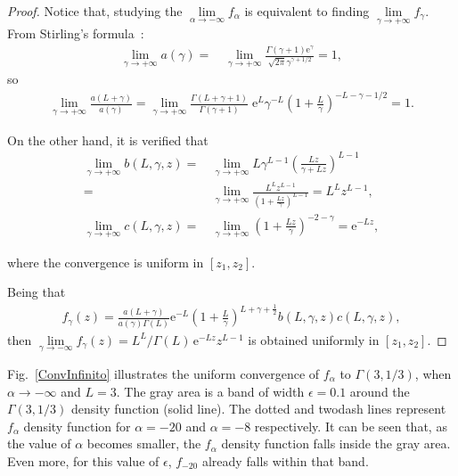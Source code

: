 \documentclass[technote,onecolumn,draftcls,12pt]{IEEEtran}
\numberwithin{equation}{section}
\newenvironment{dem}[1][Proof]{\begin{proof}[{\it #1}]}{\end{proof}}
\newcommand{\e}{\mathrm{e}}
\newcommand{\al}{&\,}
\newcommand{\pa}[1]{\ensuremath{\left( #1 \right)}}
\begin{document}
\begin{dem}
	Notice that, studying the $\lim\limits_{\alpha\to-\infty} f_{\alpha}$ is equivalent to finding
	$\lim\limits_{\gamma\to+\infty} f_{\gamma}$.
From Stirling's formula~\cite{abramowitz1964}:
\begin{align*}
\lim_{\gamma\to+\infty} a\pa{\gamma} = 
\al \lim_{\gamma\to+\infty}\frac{\Gamma\pa{\gamma+1}\e^{\gamma}}{\sqrt{2\pi}\gamma^{\gamma+1/2}} = 1,
\end{align*}
so
\begin{align*}
\lim_{\gamma\to+\infty} \frac{a\pa{L+\gamma}}{a\pa{\gamma}} = 
\lim_{\gamma\to+\infty}\frac{\Gamma({L+\gamma+1})}{\Gamma\pa{\gamma+1}}
 \; \e^{L}\gamma^{-L}\left({1+\frac{L}{\gamma}}\right)^{-L-\gamma-1/2}
= 1.
\end{align*}

On the other hand, it is verified that
\begin{align*}
\lim_{\gamma\to+\infty} b\pa{L,\gamma,z} =
\al \lim_{\gamma\to+\infty}L\gamma^{L-1}\pa{\frac{Lz}{\gamma+Lz}}^{L-1} \\
= \al \lim_{\gamma\to+\infty} \frac{L^{L} z^{L-1}}{\pa{1+\frac{Lz}{\gamma}}^{L-1}} = L^{L} z^{L-1},\\
\lim_{\gamma\to+\infty} c\pa{L,\gamma,z} = \al \lim_{\gamma\to+\infty}\pa{1+\frac{Lz}{\gamma}}^{-2-\gamma} = \e^{-Lz},
\end{align*}
	
where the convergence is uniform in $[z_{1},z_{2}]$.
	
Being that
\begin{align*}
f_{\gamma}\pa{z} = \frac{a\pa{L+\gamma}}{a\pa{\gamma}\Gamma\pa{L}}\e^{-L}\pa{1+\frac{L}{\gamma}}^{L+\gamma+\frac 1 2}
b\pa{L,\gamma,z}c\pa{L,\gamma,z},
\end{align*}
	then $\lim\limits_{\gamma\to-\infty} f_{\gamma}\pa{z} = L^{L}/\Gamma\pa{L}\,\e^{-Lz}z^{L-1}$
	is obtained uniformly in $[z_{1},z_{2}]$.
\end{dem}

Fig.~\ref{ConvInfinito} illustrates the uniform convergence of $f_{\alpha}$ to $\Gamma(3,1/3)$, when $\alpha \to -\infty$ and $L=3$. 
The gray area is a band of width $\epsilon=0.1$ around the $\Gamma(3,1/3)$ density function (solid line). 
The dotted and twodash lines represent $f_{\alpha}$ density function for $\alpha=-20$ and $\alpha=-8$ respectively. 
It can be seen that, as the value of $\alpha$ becomes smaller, the $f_{\alpha}$ density function falls inside the gray area. 
Even more, for this value of $\epsilon$, $f_{-20}$ already falls within that band.
\end{document}
